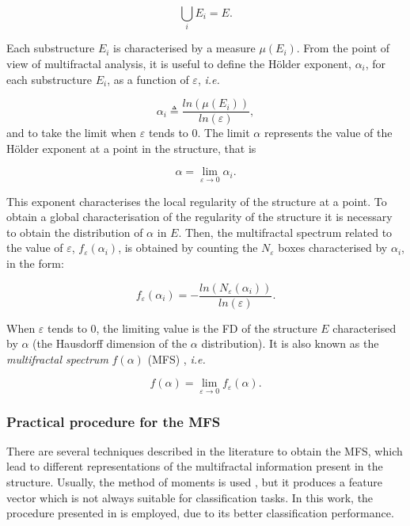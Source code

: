 \begin{equation}
\displaystyle\bigcup_{i}E_{i} = E.
\end{equation}

Each substructure $E_{i}$ is characterised by a measure $\mu(E_{i})$. From the point of view of multifractal analysis, it is useful to define the H\"older exponent, $\alpha_{i}$, for each substructure $E_{i}$, as a function of $\varepsilon$, {\em i.e.}


\begin{equation}
\alpha_{i} \triangleq \frac{ln(\mu(E_{i}))}{ln(\varepsilon)},
\label{eqn:eqn4}
\end{equation}
\noindent
and to take the limit when $\varepsilon$ tends to $0$. The limit $\alpha$ represents the value of the H\"older exponent at a point in the structure, that is

\begin{equation}
\alpha = \lim_{\varepsilon\to0}{\alpha_{i}}.
\label{eqn:eqn5}
\end{equation}

This exponent characterises the local regularity of the structure at a point. To obtain a global characterisation of the regularity of the structure it is necessary to obtain the distribution of $\alpha$ in $E$. Then, the multifractal spectrum related to the value of $\varepsilon$, $f_{\varepsilon}(\alpha_{i})$, is obtained by counting the $N_{\varepsilon}$ boxes characterised by $\alpha_{i}$, in the form:

\begin{equation}
f_{\varepsilon}(\alpha_{i}) = - \frac{ln(N_{\varepsilon}(\alpha_{i}))}{ln(\varepsilon)}.
\label{eqn:eqn6}
\end{equation}

When $\varepsilon$ tends to $0$, the limiting value is the FD of the structure $E$ characterised by $\alpha$ (the Hausdorff dimension of the $\alpha$ distribution). It is also known as the {\em multifractal spectrum} $f(\alpha)$ (MFS) \cite{Silvetti2010}, {\em i.e.}

\begin{equation}
f(\alpha) = \lim_{\varepsilon\to0}{f_{\varepsilon}(\alpha)}.
\label{eqn:eqn7}
\end{equation}

\subsubsection{Practical procedure for the MFS}
There are several techniques described in the literature to obtain the MFS, which lead to different representations of the multifractal information present in the structure. Usually, the method of moments is used \cite{Mendoza2010,Serrano2012}, but it produces a feature vector which is not always suitable for classification tasks. In this work, the procedure presented in \cite{Xu2009} is employed, due to its better classification performance.

